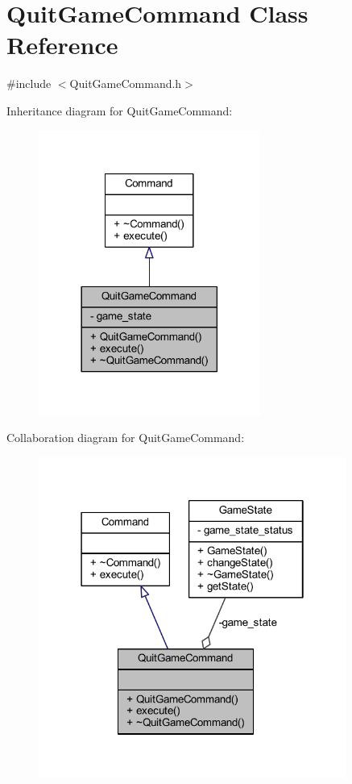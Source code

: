 \hypertarget{class_quit_game_command}{}\section{Quit\+Game\+Command Class Reference}
\label{class_quit_game_command}


{\ttfamily \#include $<$Quit\+Game\+Command.\+h$>$}



Inheritance diagram for Quit\+Game\+Command\+:\nopagebreak
\begin{figure}[H]
\begin{center}
\leavevmode
\includegraphics[width=206pt]{class_quit_game_command__inherit__graph}
\end{center}
\end{figure}


Collaboration diagram for Quit\+Game\+Command\+:\nopagebreak
\begin{figure}[H]
\begin{center}
\leavevmode
\includegraphics[width=286pt]{class_quit_game_command__coll__graph}
\end{center}
\end{figure}
